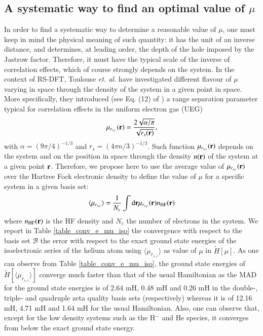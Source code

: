 \documentclass[aip,jcp,reprint,noshowkeys,superscriptaddress]{revtex4-1}
\newcommand{\basis}[0]{\mathcal{B}}
\newcommand{\mursc}{ \mu_{r_{s,c}}}
\newcommand{\murscav}{\langle \mu_{r_{s,c}}\rangle}
\begin{document}
\subsection{A systematic way to find an optimal value of $\mu$ }
In order to find a systematic way to determine a reasonable value of $\mu$, one must keep in mind the physical meaning of such quantity: it has the unit of an inverse distance, and determines, at leading order, the depth of the hole imposed by the Jastrow factor. 
Therefore, it must have the typical scale of the inverse of correlation effects, which of course strongly depends on the system. In the context of RS-DFT, Toulouse \textit{et. al.}\cite{TouColSav-JCP-05} have investigated different flavour of $\mu$ varying in space through the density of the system in a given point in space. 
More specifically, they introduced (see Eq. (12) of ) a range separation parameter typical for correlation effects in the uniform electron gas (UEG) 
\begin{equation}
 \mursc({\bf r}) =  \frac{2\sqrt{\alpha / \pi}}{\sqrt{r_s({\bf r})}},
\end{equation}
with $\alpha = (9 \pi/4)^{-1/3}$ and $r_s = (4 \pi n/3)^{-1/3}$. 
Such function $\mursc({\bf r})$ depends on the system and on the position in space through the density $n({\bf r})$ of the system at a given point ${\bf r}$. 
Therefore, we propose here to use the average value of $\mursc({\bf r})$ over the Hartree Fock electronic density to define the value of $\mu$ for a specific system in a given basis set:
\begin{equation}
 \label{eq:mu_av_rsc}
 \murscav = \frac{1}{N_e}\int \text{d}{\bf r} \mursc({\bf r}) n_{\text{HF}}({\bf r}) 
\end{equation}
where $n_{\text{HF}}({\bf r})$ is the HF density and $N_e$ the number of electrons in the system. 
We report in Table \ref{table_conv_e_mu_iso} the convergence with respect to the basis set $\basis$ the error with respect to the exact ground state energies of the isoelectronic series of the helium atom using $\murscav$ as value of $\mu$ in $\tilde{H}[\mu]$. 
As one can observe from  Table \ref{table_conv_e_mu_iso}, the ground state energies of $\tilde{H}[\murscav]$ converge much faster than that of the usual Hamiltonian as the MAD for the ground state energies is of 2.64 mH, 0.48 mH and 0.26 mH in the double-, triple- and quadruple zeta quality basis sets (respectively) whereas it is of 12.16 mH, 4.71 mH and 1.64 mH for the usual Hamiltonian. Also, one can observe that, except for the low density systems such as the H${^-}$ and He species, it converges from below the exact ground state energy. 
\end{document}
